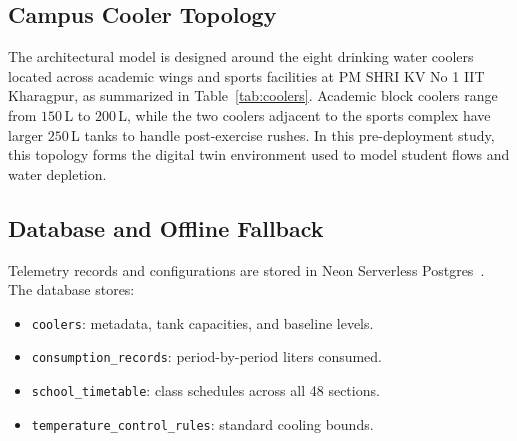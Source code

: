 \documentclass[conference]{IEEEtran}
\begin{document}
\subsection{Campus Cooler Topology}
The architectural model is designed around the eight drinking water coolers located across academic wings and sports facilities at PM SHRI KV No 1 IIT Kharagpur, as summarized in Table~\ref{tab:coolers}. Academic block coolers range from $150$\,L to $200$\,L, while the two coolers adjacent to the sports complex have larger $250$\,L tanks to handle post-exercise rushes. In this pre-deployment study, this topology forms the digital twin environment used to model student flows and water depletion.

\begin{table}[!t]
\centering
\caption{Campus Water Cooler Infrastructure Model at PM SHRI KV No 1 IIT Kharagpur}
\label{tab:coolers}
\end{table}

\subsection{Database and Offline Fallback}
Telemetry records and configurations are stored in Neon Serverless Postgres~\cite{neondb2024}. The database stores:
\begin{itemize}
    \item \texttt{coolers}: metadata, tank capacities, and baseline levels.
    \item \texttt{consumption\_records}: period-by-period liters consumed.
    \item \texttt{school\_timetable}: class schedules across all 48 sections.
    \item \texttt{temperature\_control\_rules}: standard cooling bounds.
\end{itemize}
\end{document}

